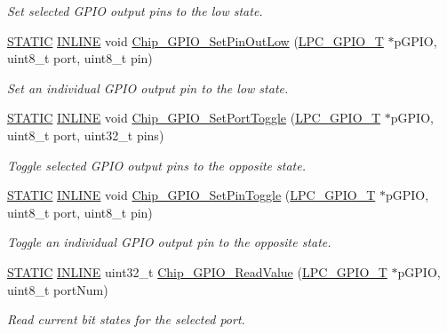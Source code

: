 \begin{DoxyCompactItemize}
\begin{DoxyCompactList}\small\item\em Set selected G\+P\+IO output pins to the low state. \end{DoxyCompactList}\item 
\hyperlink{group___l_p_c___types___public___macros_ga10b2d890d871e1489bb02b7e70d9bdfb}{S\+T\+A\+T\+IC} \hyperlink{spifi__18xx__43xx_8h_a2eb6f9e0395b47b8d5e3eeae4fe0c116}{I\+N\+L\+I\+NE} void \hyperlink{group___g_p_i_o__18_x_x__43_x_x_ga0e06760450b8e7a2c71920b06bcd6286}{Chip\+\_\+\+G\+P\+I\+O\+\_\+\+Set\+Pin\+Out\+Low} (\hyperlink{struct_l_p_c___g_p_i_o___t}{L\+P\+C\+\_\+\+G\+P\+I\+O\+\_\+T} $\ast$p\+G\+P\+IO, uint8\+\_\+t port, uint8\+\_\+t pin)
\begin{DoxyCompactList}\small\item\em Set an individual G\+P\+IO output pin to the low state. \end{DoxyCompactList}\item 
\hyperlink{group___l_p_c___types___public___macros_ga10b2d890d871e1489bb02b7e70d9bdfb}{S\+T\+A\+T\+IC} \hyperlink{spifi__18xx__43xx_8h_a2eb6f9e0395b47b8d5e3eeae4fe0c116}{I\+N\+L\+I\+NE} void \hyperlink{group___g_p_i_o__18_x_x__43_x_x_ga59d08adbd1e9e6e7e727cf01ff769a8f}{Chip\+\_\+\+G\+P\+I\+O\+\_\+\+Set\+Port\+Toggle} (\hyperlink{struct_l_p_c___g_p_i_o___t}{L\+P\+C\+\_\+\+G\+P\+I\+O\+\_\+T} $\ast$p\+G\+P\+IO, uint8\+\_\+t port, uint32\+\_\+t pins)
\begin{DoxyCompactList}\small\item\em Toggle selected G\+P\+IO output pins to the opposite state. \end{DoxyCompactList}\item 
\hyperlink{group___l_p_c___types___public___macros_ga10b2d890d871e1489bb02b7e70d9bdfb}{S\+T\+A\+T\+IC} \hyperlink{spifi__18xx__43xx_8h_a2eb6f9e0395b47b8d5e3eeae4fe0c116}{I\+N\+L\+I\+NE} void \hyperlink{group___g_p_i_o__18_x_x__43_x_x_ga5437e5a8ae2ce7662b605f9961aad8f5}{Chip\+\_\+\+G\+P\+I\+O\+\_\+\+Set\+Pin\+Toggle} (\hyperlink{struct_l_p_c___g_p_i_o___t}{L\+P\+C\+\_\+\+G\+P\+I\+O\+\_\+T} $\ast$p\+G\+P\+IO, uint8\+\_\+t port, uint8\+\_\+t pin)
\begin{DoxyCompactList}\small\item\em Toggle an individual G\+P\+IO output pin to the opposite state. \end{DoxyCompactList}\item 
\hyperlink{group___l_p_c___types___public___macros_ga10b2d890d871e1489bb02b7e70d9bdfb}{S\+T\+A\+T\+IC} \hyperlink{spifi__18xx__43xx_8h_a2eb6f9e0395b47b8d5e3eeae4fe0c116}{I\+N\+L\+I\+NE} uint32\+\_\+t \hyperlink{group___g_p_i_o__18_x_x__43_x_x_gaadfa7274313165ae6dec004a125a1bcf}{Chip\+\_\+\+G\+P\+I\+O\+\_\+\+Read\+Value} (\hyperlink{struct_l_p_c___g_p_i_o___t}{L\+P\+C\+\_\+\+G\+P\+I\+O\+\_\+T} $\ast$p\+G\+P\+IO, uint8\+\_\+t port\+Num)
\begin{DoxyCompactList}\small\item\em Read current bit states for the selected port. \end{DoxyCompactList}\end{DoxyCompactItemize}


